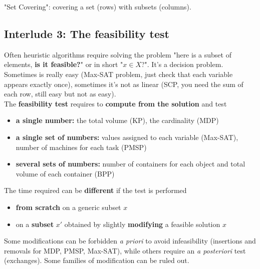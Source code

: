 "Set Covering": covering a set (rows) with subsets (columns).\\

\newpage

\subsection*{Interlude 3: The feasibility test}
Often heuristic algorithms require solving the problem "here is a subset of elements, \textbf{is it feasible?}" or in short "$x \in X$?". It's a decision problem.\\

Sometimes is really easy (Max-SAT problem, just check that each variable appears exactly once), sometimes it's not as linear (SCP, you need the sum of each row, still easy but not as easy).\\

The \textbf{feasibility test} requires to \textbf{compute from the solution} and test
\begin{itemize}
	\item \textbf{a single number:} the total volume (KP), the cardinality (MDP)
	\item \textbf{a single set of numbers:} values assigned to each variable (Max-SAT), number of machines for each task (PMSP)
	\item \textbf{several sets of numbers:} number of containers for each object and total volume of each container (BPP)
\end{itemize}
\nn

The time required can be \textbf{different} if the test is performed
\begin{itemize}
	\item \textbf{from scratch} on a generic subset $x$
	\item on a \textbf{subset} $x'$ obtained by slightly \textbf{modifying} a feasible solution $x$
\end{itemize}
\nn

Some modifications can be forbidden \textit{a priori} to avoid infeasibility (insertions and removals for MDP, PMSP, Max-SAT), while others require an \textit{a posteriori} test (exchanges). Some families of modification can be ruled out.\\


\newpage


